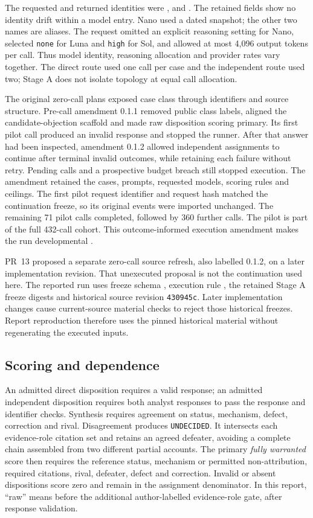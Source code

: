 \documentclass[preprint,12pt]{elsarticle}
\begin{document}
The requested and returned identities were ,  and . The retained fields show no identity drift within a model entry. Nano used a dated snapshot; the other two names are aliases. The request omitted an explicit reasoning setting for Nano, selected \texttt{none} for Luna and \texttt{high} for Sol, and allowed at most 4,096 output tokens per call. Thus model identity, reasoning allocation and provider rates vary together. The direct route used one call per case and the independent route used two; Stage A does not isolate topology at equal call allocation.

The original zero-call plans exposed case class through identifiers and source structure. Pre-call amendment 0.1.1 removed public class labels, aligned the candidate-objection scaffold and made raw disposition scoring primary. Its first pilot call produced an invalid response and stopped the runner. After that answer had been inspected, amendment 0.1.2 allowed independent assignments to continue after terminal invalid outcomes, while retaining each failure without retry. Pending calls and a prospective budget breach still stopped execution. The amendment retained the cases, prompts, requested models, scoring rules and ceilings. The first pilot request identifier and request hash matched the continuation freeze, so its original events were imported unchanged. The remaining 71 pilot calls completed, followed by 360 further calls. The pilot is part of the full 432-call cohort. This outcome-informed execution amendment makes the run developmental \citep{earlBiasStageA}.

PR~13 proposed a separate zero-call source refresh, also labelled 0.1.2, on a later implementation revision. That unexecuted proposal is not the continuation used here. The reported run uses freeze schema , execution rule , the retained Stage A freeze digests and historical source revision \texttt{430945c}. Later implementation changes cause current-source material checks to reject those historical freezes. Report reproduction therefore uses the pinned historical material without regenerating the executed inputs.

\subsection{Scoring and dependence}
An admitted direct disposition requires a valid response; an admitted independent disposition requires both analyst responses to pass the response and identifier checks. Synthesis requires agreement on status, mechanism, defect, correction and rival. Disagreement produces \texttt{UNDECIDED}. It intersects each evidence-role citation set and retains an agreed defeater, avoiding a complete chain assembled from two different partial accounts. The primary \emph{fully warranted} score then requires the reference status, mechanism or permitted non-attribution, required citations, rival, defeater, defect and correction. Invalid or absent dispositions score zero and remain in the assignment denominator. In this report, ``raw'' means before the additional author-labelled evidence-role gate, after response validation.
\end{document}
